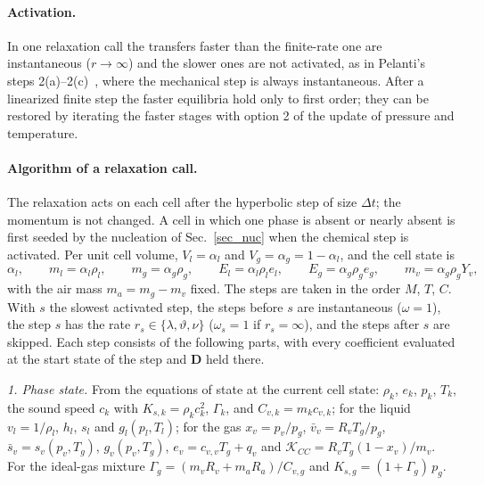 \paragraph{Activation.}
In one relaxation call the transfers faster than the finite-rate one are instantaneous ($r\to\infty$) and the slower ones are not activated, as in Pelanti's steps 2(a)--2(c)~\cite[Sec.~5]{Pelanti2022}, where the mechanical step is always instantaneous. After a linearized finite step the faster equilibria hold only to first order; they can be restored by iterating the faster stages with option 2 of the update of pressure and temperature.

\paragraph{Algorithm of a relaxation call.}
The relaxation acts on each cell after the hyperbolic step of size $\Delta t$; the momentum is not changed. A cell in which one phase is absent or nearly absent is first seeded by the nucleation of Sec.~\ref{sec_nuc} when the chemical step is activated. Per unit cell volume, $V_l=\alpha_l$ and $V_g=\alpha_g=1-\alpha_l$, and the cell state is
\begin{equation}\label{cell_state}
\alpha_l,\qquad m_l=\alpha_l\rho_l,\qquad m_g=\alpha_g\rho_g,\qquad E_l=\alpha_l\rho_le_l,\qquad E_g=\alpha_g\rho_ge_g,\qquad m_v=\alpha_g\rho_gY_v,
\end{equation}
with the air mass $m_a=m_g-m_v$ fixed. The steps are taken in the order $M$, $T$, $C$. With $s$ the slowest activated step, the steps before $s$ are instantaneous ($\omega=1$), the step $s$ has the rate $r_s\in\{\lambda,\vartheta,\nu\}$ ($\omega_s=1$ if $r_s=\infty$), and the steps after $s$ are skipped. Each step consists of the following parts, with every coefficient evaluated at the start state of the step and $\boldsymbol{D}$ held there.

\emph{1. Phase state.} From the equations of state at the current cell state: $\rho_k$, $e_k$, $p_k$, $T_k$, the sound speed $c_k$ with $K_{s,k}=\rho_kc_k^2$, $\Gamma_k$, and $C_{v,k}=m_kc_{v,k}$; for the liquid $v_l=1/\rho_l$, $h_l$, $s_l$ and $g_l(p_l,T_l)$; for the gas $x_v=p_v/p_g$, $\bar v_v=R_vT_g/p_g$, $\bar s_v=s_v(p_v,T_g)$, $g_v(p_v,T_g)$, $e_v=c_{v,v}T_g+q_v$ and $\mathcal{K}_{CC}=R_vT_g(1-x_v)/m_v$. For the ideal-gas mixture $\Gamma_g=(m_vR_v+m_aR_a)/C_{v,g}$ and $K_{s,g}=(1+\Gamma_g)\,p_g$.

